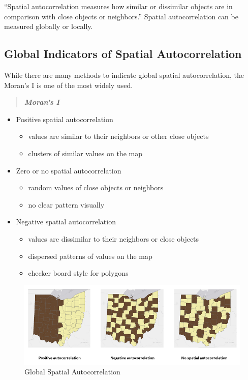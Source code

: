 \documentclass[
  11pt,
]{book}
\providecommand{\tightlist}{%
  \setlength{\itemsep}{0pt}\setlength{\parskip}{0pt}}
\begin{document}
``Spatial autocorrelation measures how similar or dissimilar objects are in comparison with close objects or neighbors.'' Spatial autocorrelation can be measured globally or locally.

\hypertarget{global-indicators-of-spatial-autocorrelation}{%
\subsection{Global Indicators of Spatial Autocorrelation}\label{global-indicators-of-spatial-autocorrelation}}

While there are many methods to indicate global spatial autocorrelation, the Moran's I is one of the most widely used.

\begin{quote}
\textbf{\emph{Moran's I }}
\end{quote}

\begin{itemize}
\tightlist
\item
  Positive spatial autocorrelation

  \begin{itemize}
  \tightlist
  \item
    values are similar to their neighbors or other close objects
  \item
    clusters of similar values on the map
  \end{itemize}
\item
  Zero or no spatial autocorrelation

  \begin{itemize}
  \tightlist
  \item
    random values of close objects or neighbors
  \item
    no clear pattern visually
  \end{itemize}
\item
  Negative spatial autocorrelation

  \begin{itemize}
  \tightlist
  \item
    values are dissimilar to their neighbors or close objects
  \item
    dispersed patterns of values on the map
  \item
    checker board style for polygons
  \end{itemize}
\end{itemize}

\begin{figure}
\includegraphics[width=1\linewidth]{img/global_spatial_autocorrelation} \caption{Global Spatial Autocorrelation}\label{fig:globalSpAutocorrelation}
\end{figure}
\end{document}
